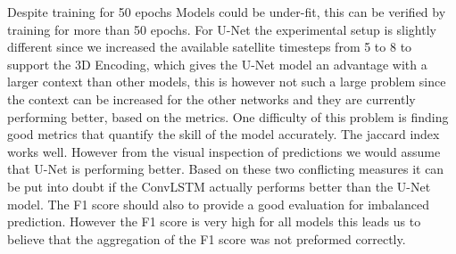 
Despite training for 50 epochs Models could be under-fit, this can be verified by training for more than 50 epochs.
For U-Net the experimental setup is slightly different since we increased the available satellite timesteps from 5 to 8 to support the 3D Encoding,
which gives the U-Net model an advantage with a larger context than other models, this is however not such a large problem since the context can be increased for the other
networks and they are currently performing better, based on the metrics.
One difficulty of this problem is finding good metrics that quantify the skill of the model accurately.
The jaccard index works well. However from the visual inspection of predictions we would assume that U-Net is performing better. Based on these two conflicting measures
it can be put into doubt if the ConvLSTM actually performs better than the U-Net model.
The F1 score should also to provide a good evaluation for imbalanced prediction. However the F1 score is very high for all models this leads us to believe that the aggregation of the F1 score was not preformed correctly.